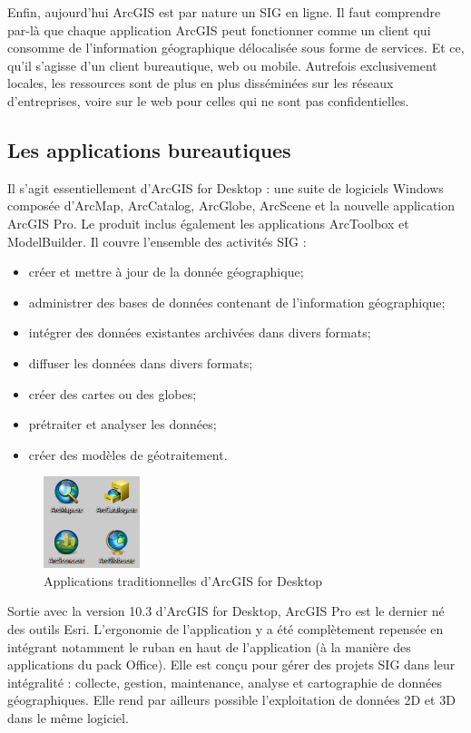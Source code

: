 \documentclass[11pt]{article}
\begin{document}
Enfin, aujourd'hui ArcGIS est par nature un SIG en ligne. Il faut comprendre par-là que chaque application ArcGIS peut fonctionner comme un client qui consomme de l’information géographique délocalisée sous forme de services. Et ce, qu’il s’agisse d’un client bureautique, web ou mobile. Autrefois exclusivement locales, les ressources sont de plus en plus disséminées sur les réseaux d’entreprises, voire sur le web pour celles qui ne sont pas confidentielles.


\subsection{Les applications bureautiques}
Il s’agit essentiellement d’ArcGIS for Desktop : une suite de logiciels Windows composée d’ArcMap, ArcCatalog, ArcGlobe, ArcScene et la nouvelle application ArcGIS Pro. Le produit inclus également les applications ArcToolbox et ModelBuilder. Il couvre l’ensemble des activités SIG : 
\begin{itemize}
	\item créer et mettre à jour de la donnée géographique;
	\item administrer des bases de données contenant de l’information géographique;
	\item intégrer des données existantes archivées dans divers formats;
	\item diffuser les données dans divers formats;
	\item créer des cartes ou des globes;
	\item prétraiter et analyser les données;
	\item créer des modèles de géotraitement.
\end{itemize}

\begin{figure}[!h]
	\center \includegraphics[width=0.25\textwidth]{img/cours/arcgis_for_desktop.png}
	\caption{Applications traditionnelles d'ArcGIS for Desktop}
\end{figure}

Sortie avec la version 10.3 d'ArcGIS for Desktop, ArcGIS Pro est le dernier né des outils Esri. L'ergonomie de l'application y a été complètement repensée en intégrant notamment le ruban en haut de l'application (à la manière des applications du pack Office). Elle est conçu pour gérer des projets SIG dans leur intégralité : collecte, gestion, maintenance, analyse et cartographie de données géographiques. Elle rend par ailleurs possible l'exploitation de données 2D et 3D dans le même logiciel.
\end{document}
